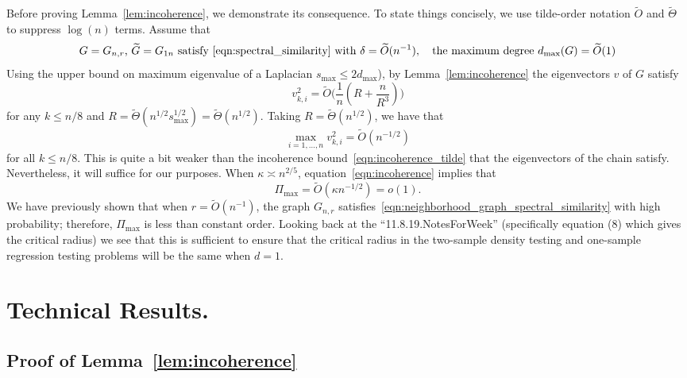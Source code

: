 \documentclass{article}
\newcommand{\1}{\mathbf{1}}
\theoremstyle{alden}
\theoremstyle{aldenthm}
\theoremstyle{definition}
\theoremstyle{remark}
\begin{document}
Before proving Lemma~\ref{lem:incoherence}, we demonstrate its consequence. To state things concisely, we use tilde-order notation $\widetilde{O}$ and $\widetilde{\Theta}$ to suppress $\log(n)$ terms. Assume that 
\begin{equation}
\label{eqn:neighborhood_graph_spectral_similarity}
\textrm{$G = G_{n,r}$, $\widetilde{G} = G_{1n}$ satisfy \eqref{eqn:spectral_similarity} with $\delta = \widetilde{O}(n^{-1})$}, \quad \textrm{the maximum degree $d_{\max}(G) = \widetilde{O}(1)$}
\end{equation}
Using the upper bound on maximum eigenvalue of a Laplacian $s_{\max} \leq 2 d_{\max}$), by Lemma~\ref{lem:incoherence} the eigenvectors $v$ of $G$ satisfy
\begin{equation*}
v_{k,i}^2 = \widetilde{O}\biggl(\frac{1}{n}\left(R + \frac{n}{R^3}\right)\biggr)
\end{equation*}
for any $k \leq n/8$ and $R = \widetilde{\Theta}(n^{1/2}s_{\max}^{1/2}) = \widetilde{\Theta}(n^{1/2})$. Taking $R = \widetilde{\Theta}(n^{1/2})$, we have that
\begin{equation}
\label{eqn:incoherence}
\max_{i = 1,\ldots,n} v_{k,i}^2 = \widetilde{O}\left(n^{-1/2}\right)
\end{equation}
for all $k \leq n/8$. This is quite a bit weaker than the incoherence bound~\eqref{eqn:incoherence_tilde} that the eigenvectors of the chain satisfy. Nevertheless, it will suffice for our purposes. When $\kappa \asymp n^{2/5}$, equation~\eqref{eqn:incoherence} implies that
\begin{equation*}
\Pi_{\max} = \widetilde{O}(\kappa n^{-1/2}) = o(1). 
\end{equation*}
We have previously shown that when $r = \widetilde{O}(n^{-1})$, the graph $G_{n,r}$ satisfies~\eqref{eqn:neighborhood_graph_spectral_similarity}  with high probability; therefore, $\Pi_{\max}$ is less than constant order. Looking back at the ``11.8.19.NotesForWeek'' (specifically equation (8) which gives the critical radius) we see that this is sufficient to ensure that the critical radius in the two-sample density testing and one-sample regression testing problems will be the same when $d = 1$. 
\section{Technical Results.}

\subsection{Proof of Lemma~\ref{lem:incoherence}}
\end{document}
